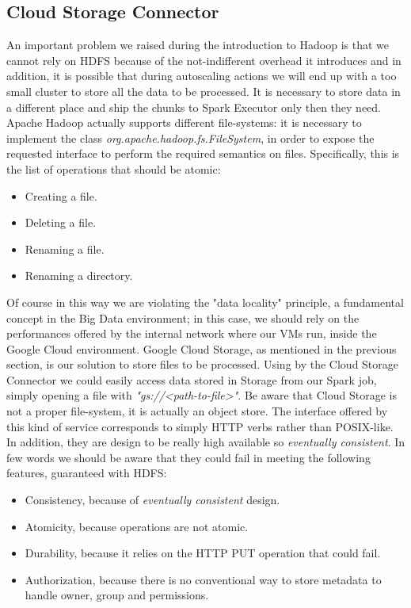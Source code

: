 \documentclass[12pt,twoside,cucitura]{toptesi}
\begin{document}
\subsection{Cloud Storage Connector}
An important problem we raised during the introduction to Hadoop is that we cannot rely on HDFS because of the not-indifferent overhead it introduces and in addition, it is possible that during autoscaling actions we will end up with a too small cluster to store all the data to be processed. It is necessary to store data in a different place and ship the chunks to Spark Executor only then they need. Apache Hadoop actually supports different file-systems: it is necessary to implement the class \textit{org.apache.hadoop.fs.FileSystem}, in order to expose the requested interface to perform the required semantics on files. Specifically, this is the list of operations that should be atomic:
\begin{itemize}
  \item Creating a file.
  \item Deleting a file.
  \item Renaming a file.
  \item Renaming a directory.
\end{itemize}
Of course in this way we are violating the "data locality" principle, a fundamental concept in the Big Data environment; in this case, we should rely on the performances offered by the internal network where our VMs run, inside the Google Cloud environment. Google Cloud Storage, as mentioned in the previous section, is our solution to store files to be processed. Using by the Cloud Storage Connector \cite{gcsconnector} we could easily access data stored in Storage from our Spark job, simply opening a file with \textit{"gs://<path-to-file>"}. Be aware that Cloud Storage is not a proper file-system, it is actually an object store. The interface offered by this kind of service corresponds to simply HTTP verbs rather than POSIX-like. In addition, they are design to be really high available so \textit{eventually consistent}. In few words we should be aware that they could fail in meeting the following features, guaranteed with HDFS:
\begin{itemize}
  \item Consistency, because of \textit{eventually consistent} design.
  \item Atomicity, because operations are not atomic.
  \item Durability, because it relies on the HTTP PUT operation that could fail.
  \item Authorization, because there is no conventional way to store metadata to handle owner, group and permissions.
\end{itemize}
\end{document}
